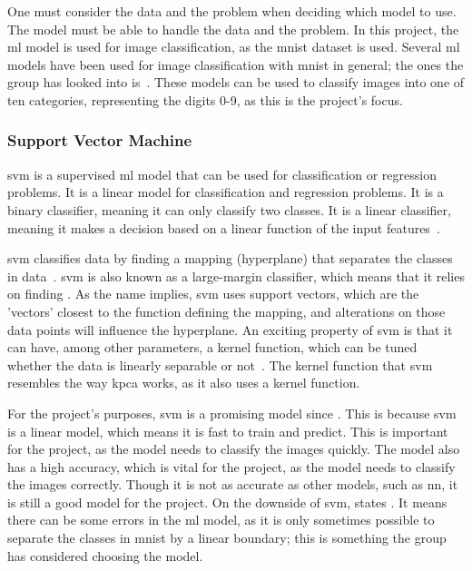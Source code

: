 One must consider the data and the problem when deciding which model to use. The model must be able to handle the data and the problem. In this project, the \gls{ml} model is used for image classification, as the \gls{mnist} dataset is used. Several \gls{ml} models have been used for image classification with \gls{mnist} in general; the ones the group has looked into is~\cite{lecun-mnist-database,IBM-computer-vision,convolutional-neural-networks-convnets,multi-column-neural-network-ciregan}. These models can be used to classify images into one of ten categories, representing the digits 0-9, as this is the project's focus.

\subsubsection{Support Vector Machine}\label{subsubsec:support-vector-machine}
\gls{svm} is a supervised \gls{ml} model that can be used for classification or regression problems. It is a linear model for classification and regression problems. It is a binary classifier, meaning it can only classify two classes. It is a linear classifier, meaning it makes a decision based on a linear function of the input features~\cite{james-statistical-learning1}.

\gls{svm} classifies data by finding a mapping (hyperplane) that separates the classes in data~\cite{faster-svm}. \gls{svm} is also known as a large-margin classifier, which means that it relies on finding . As the name implies, \gls{svm} uses support vectors, which are the 'vectors' closest to the function defining the mapping, and alterations on those data points will influence the hyperplane.
An exciting property of \gls{svm} is that it can have, among other parameters, a kernel function, which can be tuned whether the data is linearly separable or not~\cite{faster-svm}. The kernel function that \gls{svm} resembles the way \gls{kpca} works, as it also uses a kernel function.

For the project's purposes, \gls{svm} is a promising model since . This is because \gls{svm} is a linear model, which means it is fast to train and predict. This is important for the project, as the model needs to classify the images quickly. The model also has a high accuracy, which is vital for the project, as the model needs to classify the images correctly. Though it is not as accurate as other models, such as \gls{nn}, it is still a good model for the project. On the downside of \gls{svm}, \cite{james-statistical-learning1} states . It means there can be some errors in the \gls{ml} model, as it is only sometimes possible to separate the classes in \gls{mnist} by a linear boundary; this is something the group has considered choosing the model.

